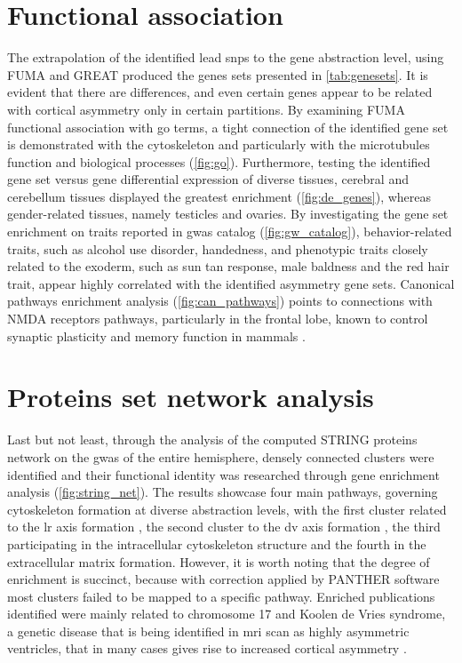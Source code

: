 \section{Functional association}
The extrapolation of the identified lead \acp{snp} to the gene abstraction level, using FUMA and GREAT produced the genes sets presented in \autoref{tab:genesets}. It is evident that there are differences, and even certain genes appear to be related with cortical asymmetry only in certain partitions. By examining FUMA functional association with \ac{go} terms, a tight connection of the identified gene set is demonstrated with the cytoskeleton and particularly with the microtubules function and biological processes (\autoref{fig:go}). Furthermore, testing the identified gene set versus gene differential expression of diverse tissues, cerebral and cerebellum tissues displayed the greatest enrichment (\autoref{fig:de_genes}), whereas gender-related tissues, namely testicles and ovaries. By investigating the gene set enrichment on traits reported in \ac{gwas} catalog (\autoref{fig:gw_catalog}), behavior-related traits, such as alcohol use disorder, handedness, and phenotypic traits closely related to the exoderm, such as sun tan response, male baldness and the red hair trait, appear highly correlated with the identified asymmetry gene sets. Canonical pathways enrichment analysis (\autoref{fig:can_pathways}) points to connections with NMDA receptors pathways, particularly in the frontal lobe,  known to control synaptic plasticity and memory function in mammals \cite{Li2009}.

\section{Proteins set network analysis}

Last but not least, through the analysis of the computed STRING proteins network on the \ac{gwas} of the entire hemisphere, densely connected clusters were identified and their functional identity was researched through gene enrichment analysis (\autoref{fig:string_net}). The results showcase four main pathways, governing cytoskeleton formation at diverse abstraction levels, with the first cluster related to the \ac{lr} axis formation \cite{Hu2017}, the second cluster to the \ac{dv} axis formation \cite{Hikasa2013}, the third participating in the intracellular cytoskeleton structure and the fourth in the extracellular matrix formation. However, it is worth noting that the degree of enrichment is succinct, because with correction applied by PANTHER software most clusters failed to be mapped to a specific pathway. Enriched publications identified were mainly related to chromosome 17 and Koolen de Vries syndrome, a genetic disease that is being identified in \ac{mri} scan as highly asymmetric ventricles, that in many cases gives rise to increased cortical asymmetry \cite{Myers2017}.

